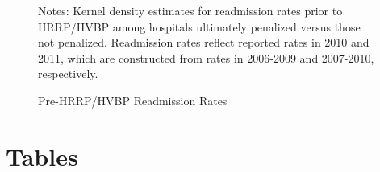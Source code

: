 \documentclass[12pt]{article}
\begin{document}
\newpage

\setlength{\captionmargin}{.5 \textwidth} \addtolength{\captionmargin}{-.5\wd\gfxbox}
\begin{figure}[htbp!]
\centering
\caption{Pre-HRRP/HVBP Readmission Rates}
\label{fig:pre_readmits}
\usebox{\gfxbox}
\par
\begin{minipage}{\wd\gfxbox}
\footnotesize
Notes:  Kernel density estimates for readmission rates prior to HRRP/HVBP among hospitals ultimately penalized versus those not penalized. Readmission rates reflect reported rates in 2010 and 2011, which are constructed from rates in 2006-2009 and 2007-2010, respectively.
\end{minipage}
\end{figure}
\newpage


\section*{Tables}
\end{document}
